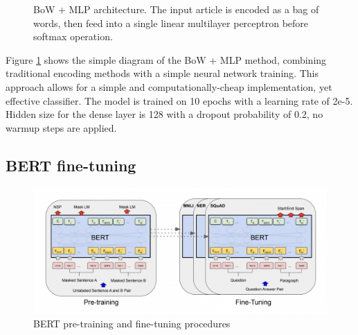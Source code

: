 \begin{figure}[htbp]
    \centering
    \caption{BoW + MLP architecture. The input article is encoded as a bag of words, then feed into a single linear multilayer perceptron before softmax operation.}
    \label{fig:bow_mlp_architecture}
\end{figure}

Figure \ref{fig:bow_mlp_architecture} shows the simple diagram of the BoW + MLP method, combining traditional encoding methods with a simple neural network training. This approach allows for a simple and computationally-cheap implementation, yet effective classifier. The model is trained on 10 epochs with a learning rate of 2e-5. Hidden size for the dense layer is 128 with a dropout probability of 0.2, no warmup steps are applied.

\subsection{BERT fine-tuning}

\begin{figure}[htbp]
    \centering
    \includegraphics[width=0.9\linewidth]{images/bert_finetuning.png}
    \caption{BERT pre-training and fine-tuning procedures \cite{devlin-2019-bert}}
    \label{fig:bert_finetuning}
\end{figure}

